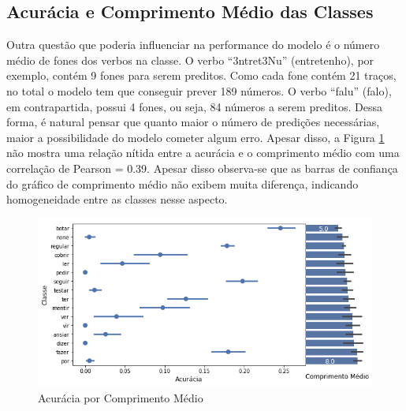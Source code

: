 




\subsection{Acurácia e Comprimento Médio das Classes}

Outra questão que poderia influenciar na performance do modelo é o número médio de fones dos verbos na classe.  O verbo “3ntret3Nu” (entretenho), por exemplo, contém 9 fones para serem preditos. Como cada fone contém 21 traços, no total o modelo tem que conseguir prever 189 números. O verbo “falu” (falo), em contrapartida, possui 4 fones, ou seja, 84 números a serem preditos. Dessa forma, é natural pensar que quanto maior o número de predições necessárias, maior a possibilidade do modelo cometer algum erro. Apesar disso, a Figura \ref{fig:kfoldprop} não mostra uma relação nítida entre a acurácia e o comprimento médio com uma correlação de Pearson = 0.39. Apesar disso observa-se que as barras de confiança do gráfico de comprimento médio não exibem muita diferença, indicando homogeneidade entre as classes nesse aspecto.

\begin{figure}[H]
  \centering
  \includegraphics[width=0.8\linewidth]{img/comp_acc.png}
  \caption{Acurácia por Comprimento Médio}
  \label{fig:kfoldprop}
\end{figure}


